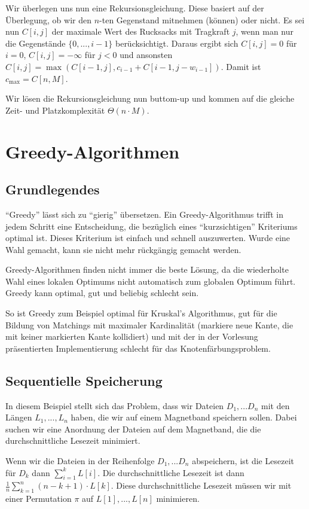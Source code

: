 \documentclass[12pt]{article}
\begin{document}
Wir überlegen uns nun eine Rekursionsgleichung. Diese basiert auf der Überlegung, ob wir den $n$-ten Gegenstand mitnehmen (können) oder nicht. Es sei nun $C[i,j]$ der maximale Wert des Rucksacks mit Tragkraft $j$, wenn man nur die Gegenstände $\{0, ..., i-1\}$ berücksichtigt. Daraus ergibt sich $C[i,j] = 0$ für $i = 0$, $C[i,j] = -\infty$ für $j < 0$ und ansonsten $C[i,j]=\max(C[i-1,j], c_{i-1}+C[i-1, j-w_{i-1}])$. Damit ist $c_{\max} = C[n,M]$.

Wir lösen die Rekursionsgleichung nun buttom-up und kommen auf die gleiche Zeit- und Platzkomplexität $\Theta(n\cdot M)$.

\section{Greedy-Algorithmen}

\subsection{Grundlegendes}

\enquote{Greedy} lässt sich zu \enquote{gierig} übersetzen. Ein Greedy-Algorithmus trifft in jedem Schritt eine Entscheidung, die bezüglich eines \enquote{kurzsichtigen} Kriteriums optimal ist. Dieses Kriterium ist einfach und schnell auszuwerten. Wurde eine Wahl gemacht, kann sie nicht mehr rückgängig gemacht werden.

Greedy-Algorithmen finden nicht immer die beste Lösung, da die wiederholte Wahl eines lokalen Optimums nicht automatisch zum globalen Optimum führt. Greedy kann optimal, gut und beliebig schlecht sein.

So ist Greedy zum Beispiel optimal für Kruskal's Algorithmus, gut für die Bildung von Matchings mit maximaler Kardinalität (markiere neue Kante, die mit keiner markierten Kante kollidiert) und mit der in der Vorlesung präsentierten Implementierung schlecht für das Knotenfärbungsproblem.

\subsection{Sequentielle Speicherung}
In diesem Beispiel stellt sich das Problem, dass wir Dateien $D_1, ... D_n$ mit den Längen $L_1, ..., L_n$ haben, die wir auf einem Magnetband speichern sollen. Dabei suchen wir eine Anordnung der Dateien auf dem Magnetband, die die durchschnittliche Lesezeit minimiert.

Wenn wir die Dateien in der Reihenfolge $D_1, ... D_n$ abspeichern, ist die Lesezeit für $D_k$ dann $\sum_{i=1}^k L[i]$. Die durchschnittliche Lesezeit ist dann $\frac{1}{n} \sum_{k=1}^{n} (n-k+1)\cdot{}L[k]$. Diese durchschnittliche Lesezeit müssen wir mit einer Permutation $\pi$ auf $L[1], ..., L[n]$ minimieren.
\end{document}
